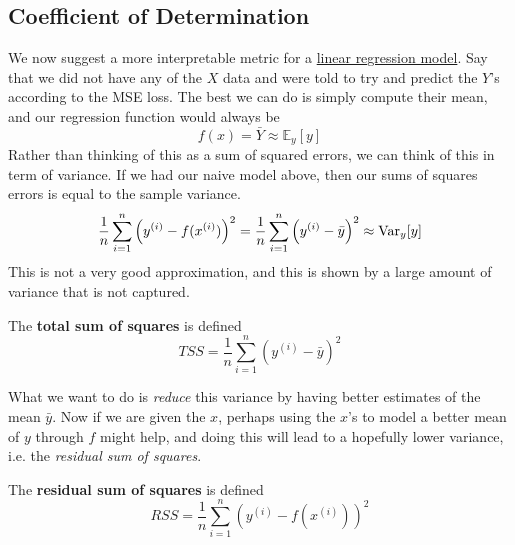 \subsection{Coefficient of Determination} 

  We now suggest a more interpretable metric for a \hyperref[def:linear-regression-model]{linear regression model}. Say that we did not have any of the $X$ data and were told to try and predict the $Y$'s according to the MSE loss. The best we can do is simply compute their mean, and our regression function would always be 
  \begin{equation}
    f(x) = \bar{Y} \approx \mathbb{E}_y[y]
  \end{equation}
  Rather than thinking of this as a sum of squared errors, we can think of this in term of variance. If we had our naive model above, then our sums of squares errors is equal to the sample variance. 
  \begin{equation}
    \frac{1}{n} \sum_{i=1}^n \left( y^{(i)} - f(x^{(i)}) \right)^2 = \frac{1}{n} \sum_{i=1}^n \left( y^{(i)} - \bar{y} \right)^2  
    \approx \operatorname{Var}_y [y]
  \end{equation}
  This is not a very good approximation, and this is shown by a large amount of variance that is not captured. 

  \begin{definition}
    \label{def:total-sum-of-squares}
    The \textbf{total sum of squares} is defined 
    \begin{equation}
      TSS = \frac{1}{n} \sum_{i=1}^n \left( y^{(i)} - \bar{y} \right)^2
    \end{equation}
  \end{definition} 

  What we want to do is \textit{reduce} this variance by having better estimates of the mean $\bar{y}$. Now if we are given the $x$, perhaps using the $x$'s to model a better mean of $y$ through $f$ might help, and doing this will lead to a hopefully lower variance, i.e. the \textit{residual sum of squares}. 

  \begin{definition}
    \label{def:residual-sum-of-squares}
    The \textbf{residual sum of squares} is defined 
    \begin{equation}
      RSS = \frac{1}{n} \sum_{i=1}^n \left( y^{(i)} - f(x^{(i)}) \right)^2 
    \end{equation}
  \end{definition} 

